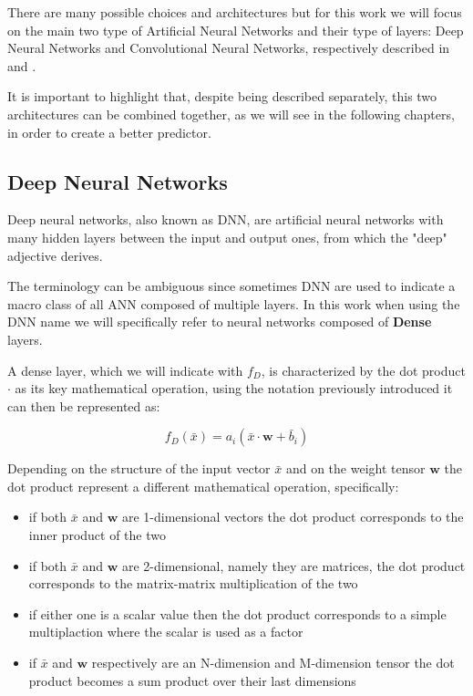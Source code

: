 There are many possible choices and architectures but for this work we will focus on the main two type of Artificial Neural Networks and their type of layers: Deep Neural Networks and Convolutional Neural Networks, respectively described in  and .

It is important to highlight that, despite being described separately, this two architectures can be combined together, as we will see in the following chapters, in order to create a better predictor.

\subsection{Deep Neural Networks}\label{dnn}

Deep neural networks, also known as DNN, are artificial neural networks with many hidden layers between the input and output ones, from which the "deep" adjective derives. 

The terminology can be ambiguous since sometimes DNN are used to indicate a macro class of all ANN composed of multiple layers. In this work when using the DNN name we will specifically refer to neural networks composed of \textbf{Dense} layers.

A dense layer, which we will indicate with $f_D$, is characterized by the dot product $\cdot$ as its key mathematical operation, using the notation previously introduced it can then be represented as:

\begin{equation}
    f_D (\bar{x})=a_i \left( \bar{x} \cdot \boldsymbol{w} + \bar{b}_i \right) 
    \label{eq:layer_dense}
\end{equation}

Depending on the structure of the input vector $\bar{x}$ and on the weight tensor $\boldsymbol{w}$ the dot product represent a different mathematical operation, specifically:
\begin{itemize}
    \item if both $\bar{x}$ and $\boldsymbol{w}$ are 1-dimensional vectors the dot product corresponds to the inner product of the two
    \item if both $\bar{x}$ and $\boldsymbol{w}$ are 2-dimensional, namely they are matrices, the dot product corresponds to the matrix-matrix multiplication of the two
     \item if either one is a scalar value then the dot product corresponds to a simple multiplaction where the scalar is used as a factor
     \item if $\bar{x}$ and $\boldsymbol{w}$ respectively are an N-dimension and M-dimension tensor the dot product becomes a sum product over their last dimensions
\end{itemize}

